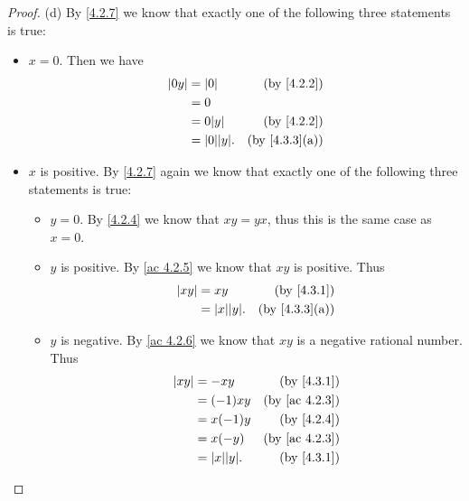\begin{proof}{(d)}
  By \cref{4.2.7} we know that exactly one of the following three statements is true:
  \begin{itemize}
    \item \(x = 0\).
          Then we have
          \begin{align*}
            \abs{0y} & = \abs{0}          & \text{(by \cref{4.2.2})}    \\
                     & = 0                                              \\
                     & = 0 \abs{y}        & \text{(by \cref{4.2.2})}    \\
                     & = \abs{0} \abs{y}. & \text{(by \cref{4.3.3}(a))}
          \end{align*}
    \item \(x\) is positive.
          By \cref{4.2.7} again we know that exactly one of the following three statements is true:
          \begin{itemize}
            \item \(y = 0\).
                  By \cref{4.2.4} we know that \(xy = yx\), thus this is the same case as \(x = 0\).
            \item \(y\) is positive.
                  By \cref{ac 4.2.5} we know that \(xy\) is positive.
                  Thus
                  \begin{align*}
                    \abs{xy} & = xy               & \text{(by \cref{4.3.1})}    \\
                             & = \abs{x} \abs{y}. & \text{(by \cref{4.3.3}(a))}
                  \end{align*}
            \item \(y\) is negative.
                  By \cref{ac 4.2.6} we know that \(xy\) is a negative rational number.
                  Thus
                  \begin{align*}
                    \abs{xy} & = -xy              & \text{(by \cref{4.3.1})}    \\
                             & = (-1)xy           & \text{(by \cref{ac 4.2.3})} \\
                             & = x(-1)y           & \text{(by \cref{4.2.4})}    \\
                             & = x(-y)            & \text{(by \cref{ac 4.2.3})} \\
                             & = \abs{x} \abs{y}. & \text{(by \cref{4.3.1})}    \\

\end{align*}
\end{itemize}
\end{itemize}
\end{proof}
